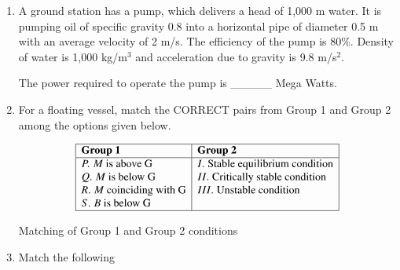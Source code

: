 \documentclass[journal]{IEEEtran}
\begin{document}
\begin{enumerate}
    \hfill{}
    
    \item A ground station has a pump, which delivers a head of 1,000 m water. It is pumping oil of specific gravity 0.8 into a horizontal pipe of diameter 0.5 m with an average velocity of 2 m/s. The efficiency of the pump is 80\%. Density of water is 1,000 kg/m$^3$ and acceleration due to gravity is 9.8 m/s$^2$.
    
    The power required to operate the pump is \_\_\_\_\_ Mega Watts.
    
    \hfill{}
    
    \item For a floating vessel, match the CORRECT pairs from Group 1 and Group 2 among the options given below. 
    
   \begin{table}[h!]
\centering
\[
\begin{array}{|l|l|}
\hline
\textbf{Group 1} & \textbf{Group 2} \\
\hline
P. \; M \text{ is above G}      & I. \; \text{Stable equilibrium condition} \\
Q. \; M \text{ is below G}      & II. \; \text{Critically stable condition} \\
R. \; M \text{ coinciding with G} & III. \; \text{Unstable condition} \\
S. \; B \text{ is below G}      &  \\
\hline
\end{array}
\]
\caption{Matching of Group 1 and Group 2 conditions}
\label{tab:stability}
\end{table}

    
    \begin{enumerate}  \end{enumerate}              
    
    \hfill{}
    
    \item Match the following
    

\end{enumerate}
\end{document}
